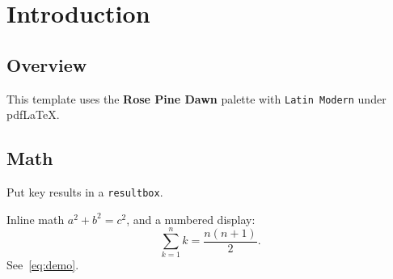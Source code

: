 \chapter{Introduction}
\label{ch:intro}

\section{Overview}

This template uses the \textbf{Rose Pine Dawn} palette with
\texttt{Latin Modern} under pdfLaTeX.

\section{Math}

\begin{resultbox}
Put key results in a \texttt{resultbox}.
\end{resultbox}

Inline math $a^2 + b^2 = c^2$, and a numbered display:
\begin{equation}
  \label{eq:demo}
  \sum_{k=1}^{n} k = \frac{n(n+1)}{2}.
\end{equation}
See~\eqref{eq:demo}.
